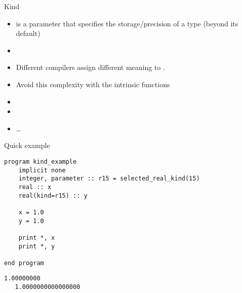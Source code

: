\begin{frame}[fragile]
  \begin{block}{Kind}\pause
    \begin{itemize}
      \item {} is a parameter that specifies the storage/precision of a type (beyond its default)
      \item {}
      \item Different compilers assign different meaning to .
      \item Avoid this complexity with the intrinsic functions 
    \end{itemize}
    \begin{itemize}
      \item {}
      \item {} 
      \item \dots
    \end{itemize}

  \end{block}
\end{frame}

\begin{frame}[fragile]
  \begin{block}{Quick example}\pause
\begin{lstlisting}
program kind_example
    implicit none
    integer, parameter :: r15 = selected_real_kind(15)
    real :: x
    real(kind=r15) :: y
    
    x = 1.0
    y = 1.0
    
    print *, x
    print *, y
    
end program
\end{lstlisting}
\begin{lstlisting}[language=shl]
   1.00000000    
   1.0000000000000000  
\end{lstlisting}
  \end{block}
\end{frame}
